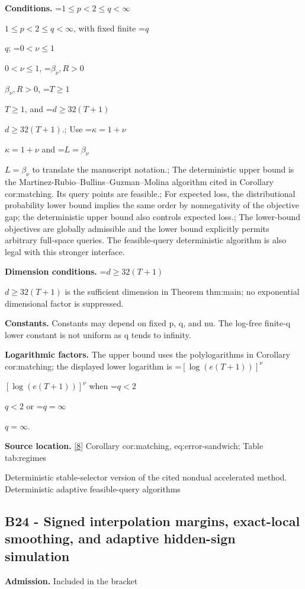 \documentclass[10pt,a4paper]{article}
\newcommand{\AtlasMath}[1]{\par\begingroup\centering\setbox0=\hbox{$\displaystyle #1$}\ifdim\wd0>1.4\linewidth\typeout{ATLAS WIDE FORMULA: \the\wd0}\fi\ifdim\wd0>\linewidth\resizebox{\linewidth}{!}{\box0}\else\box0\fi\par\endgroup}
\newcommand{\AtlasInlineMath}[1]{\begingroup\setbox0=\hbox{$#1$}\ifdim\wd0>.4\linewidth\endgroup\AtlasMath{#1}\else\endgroup$#1$\fi}
\begin{document}
\textbf{Conditions.} \AtlasInlineMath{1\le p<2\le q<\infty}, with fixed finite \AtlasInlineMath{q}; \AtlasInlineMath{0<\nu\le1}, \AtlasInlineMath{\beta_\nu,R>0}, \AtlasInlineMath{T\ge1}, and \AtlasInlineMath{d\ge32(T+1)}.; Use \AtlasInlineMath{\kappa=1+\nu} and \AtlasInlineMath{L=\beta_\nu} to translate the manuscript notation.; The deterministic upper bound is the Martinez-Rubio--Bullins--Guzman--Molina algorithm cited in Corollary cor:matching. Its query points are feasible.; For expected loss, the distributional probability lower bound implies the same order by nonnegativity of the objective gap; the deterministic upper bound also controls expected loss.; The lower-bound objectives are globally admissible and the lower bound explicitly permits arbitrary full-space queries. The feasible-query deterministic algorithm is also legal with this stronger interface.



\textbf{Dimension conditions.} \AtlasInlineMath{d\ge32(T+1)} is the sufficient dimension in Theorem thm:main; no exponential dimensional factor is suppressed.



\textbf{Constants.} Constants may depend on fixed p, q, and nu. The log-free finite-q lower constant is not uniform as q tends to infinity.



\textbf{Logarithmic factors.} The upper bound uses the polylogarithms in Corollary cor:matching; the displayed lower logarithm is \AtlasInlineMath{[\log(e(T+1))]^\nu} when \AtlasInlineMath{q<2} or \AtlasInlineMath{q=\infty}.



\textbf{Source location.} \href{https://github.com/WU-Wendao/Colombo/blob/main/colombo_sensorium/Complexity_altas/data/sources/colombo/B1/manuscript.pdf}{[8]} Corollary cor:matching, eq:error-sandwich; Table tab:regimes



Deterministic stable-selector version of the cited nondual accelerated method. Deterministic adaptive feasible-query algorithms



\subsection{B24 - Signed interpolation margins, exact-local smoothing, and adaptive hidden-sign simulation}


\textbf{Admission.} Included in the bracket
\end{document}
